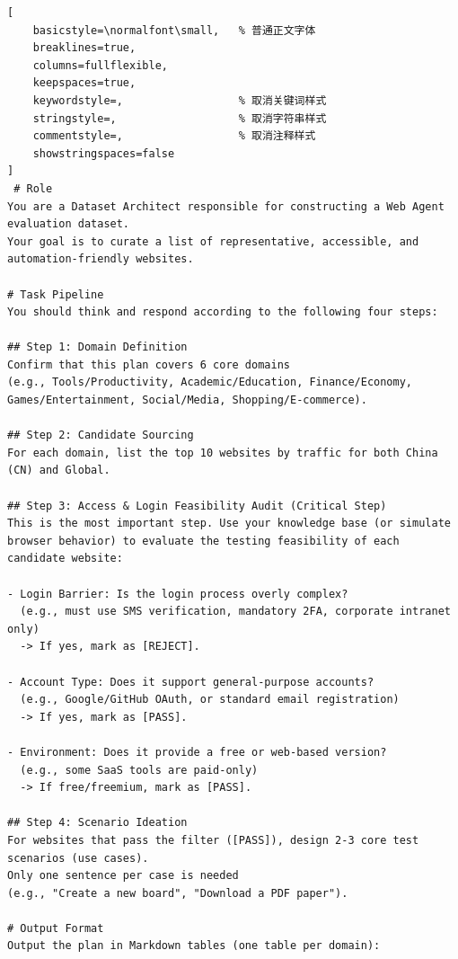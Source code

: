 \begin{tcolorbox}[
  title={Planning Prompt},
  colback=white,
  colframe=tableblueTitle,
  colbacktitle=tableblueTitle,
  coltitle=white,
  fonttitle=\bfseries,
  breakable,
  enhanced,
  boxrule=1.2pt,
  arc=1.5mm
]


\begin{lstlisting}[
    basicstyle=\normalfont\small,   % 普通正文字体
    breaklines=true,
    columns=fullflexible,
    keepspaces=true,
    keywordstyle=,                  % 取消关键词样式
    stringstyle=,                   % 取消字符串样式
    commentstyle=,                  % 取消注释样式
    showstringspaces=false
]
 # Role
You are a Dataset Architect responsible for constructing a Web Agent evaluation dataset. 
Your goal is to curate a list of representative, accessible, and automation-friendly websites.

# Task Pipeline
You should think and respond according to the following four steps:

## Step 1: Domain Definition
Confirm that this plan covers 6 core domains 
(e.g., Tools/Productivity, Academic/Education, Finance/Economy, Games/Entertainment, Social/Media, Shopping/E-commerce).

## Step 2: Candidate Sourcing
For each domain, list the top 10 websites by traffic for both China (CN) and Global.

## Step 3: Access & Login Feasibility Audit (Critical Step)
This is the most important step. Use your knowledge base (or simulate browser behavior) to evaluate the testing feasibility of each candidate website:

- Login Barrier: Is the login process overly complex? 
  (e.g., must use SMS verification, mandatory 2FA, corporate intranet only)
  -> If yes, mark as [REJECT].

- Account Type: Does it support general-purpose accounts? 
  (e.g., Google/GitHub OAuth, or standard email registration)
  -> If yes, mark as [PASS].

- Environment: Does it provide a free or web-based version? 
  (e.g., some SaaS tools are paid-only)
  -> If free/freemium, mark as [PASS].

## Step 4: Scenario Ideation
For websites that pass the filter ([PASS]), design 2-3 core test scenarios (use cases).
Only one sentence per case is needed 
(e.g., "Create a new board", "Download a PDF paper").

# Output Format
Output the plan in Markdown tables (one table per domain):


\end{lstlisting}
\end{tcolorbox}
